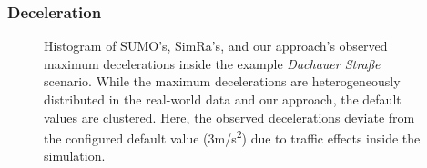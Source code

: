 \subsubsection{Deceleration}
\label{subsubsec:deceleration_evaluation}
\begin{figure}[t]
    \centering
    \hfill
    \caption{%
        Histogram of SUMO's, SimRa's, and our approach's observed maximum decelerations inside the example \textit{Dachauer Straße} scenario.
        While the maximum decelerations are heterogeneously distributed in the real-world data and our approach, the default values are clustered.
        Here, the observed decelerations deviate from the configured default value (3m/s\textsuperscript{2}) due to traffic effects inside the simulation.
    }%
    \label{fig:eval_dec}
\end{figure}

